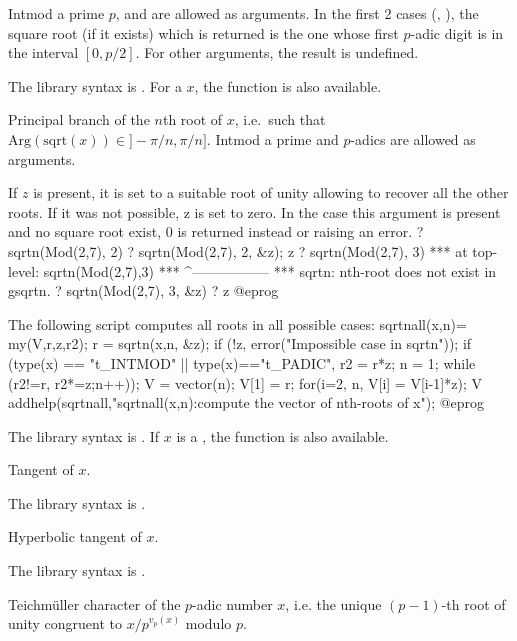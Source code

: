 Intmod a prime $p$,  and  are allowed as arguments. In
the first 2 cases (, ), the square root (if it
exists) which is returned is the one whose first $p$-adic digit is in the
interval $[0,p/2]$. For other arguments, the result is undefined.

The library syntax is .
For a  $x$, the function
 is also available.

\label{se:sqrtn}
Principal branch of the $n$th root of $x$,
i.e.~such that $\text{Arg}(\text{sqrt}(x))\in{} ]-\pi/n, \pi/n]$. Intmod
a prime and $p$-adics are allowed as arguments.

If $z$ is present, it is set to a suitable root of unity allowing to
recover all the other roots. If it was not possible, z is
set to zero. In the case this argument is present and no square root exist,
$0$ is returned instead or raising an error.
\bprog
? sqrtn(Mod(2,7), 2)
? sqrtn(Mod(2,7), 2, &z); z
? sqrtn(Mod(2,7), 3)
  ***   at top-level: sqrtn(Mod(2,7),3)
  ***                 ^-----------------
  *** sqrtn: nth-root does not exist in gsqrtn.
? sqrtn(Mod(2,7), 3,  &z)
? z
@eprog

The following script computes all roots in all possible cases:
\bprog
sqrtnall(x,n)=
{ my(V,r,z,r2);
  r = sqrtn(x,n, &z);
  if (!z, error("Impossible case in sqrtn"));
  if (type(x) == "t_INTMOD" || type(x)=="t_PADIC",
    r2 = r*z; n = 1;
    while (r2!=r, r2*=z;n++));
  V = vector(n); V[1] = r;
  for(i=2, n, V[i] = V[i-1]*z);
  V
}
addhelp(sqrtnall,"sqrtnall(x,n):compute the vector of nth-roots of x");
@eprog\noindent

The library syntax is .
If $x$ is a , the function
 is also available.

\label{se:tan}
Tangent of $x$.

The library syntax is .

\label{se:tanh}
Hyperbolic tangent of $x$.

The library syntax is .

\label{se:teichmuller}
Teichm\"uller character of the $p$-adic number $x$, i.e. the unique
$(p-1)$-th root of unity congruent to $x / p^{v_p(x)}$ modulo $p$.

